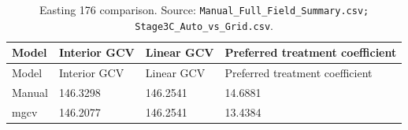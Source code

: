 \begin{longtable}{@{}p{2.2cm}p{3cm}p{3cm}p{4.9cm}@{}}
\caption{Easting 176 comparison. Source: \texttt{Manual\_Full\_Field\_Summary.csv; Stage3C\_Auto\_vs\_Grid.csv}.}\label{tab:easting-176-comparison}\\
\toprule
Model & Interior GCV & Linear GCV & Preferred treatment coefficient\\
\midrule
\endfirsthead
\toprule
Model & Interior GCV & Linear GCV & Preferred treatment coefficient\\
\midrule
\endhead
Manual & 146.3298 & 146.2541 & 14.6881\\
mgcv & 146.2077 & 146.2541 & 13.4384\\
\bottomrule
\end{longtable}
